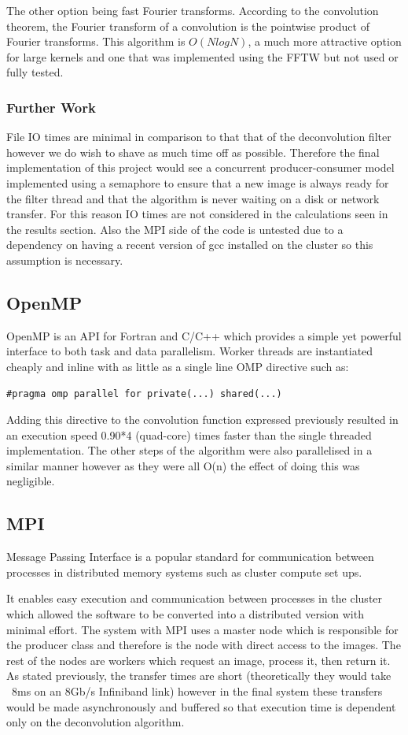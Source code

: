 \documentclass{article}
\begin{document}
The other option being fast Fourier transforms. According to the convolution
theorem, the Fourier transform of a convolution is the pointwise product of
Fourier transforms. This algorithm is $O(NlogN)$, a much more attractive option
for large kernels and one that was implemented using the FFTW but not used or
fully tested.

\subsubsection{Further Work}
File IO times are minimal in comparison to that that of the deconvolution filter
however we do wish to shave as much time off as possible. Therefore the final
implementation of this project would see a concurrent producer-consumer model
implemented using a semaphore to ensure that a new image is always ready for the
filter thread and that the algorithm is never waiting on a disk or network
transfer. For this reason IO times are not considered in the calculations seen
in the results section. Also the MPI side of the code is untested due to
a dependency on having a recent version of gcc installed on the cluster so this
assumption is necessary.

\subsection{OpenMP}
OpenMP is an API for Fortran and C/C++ which provides a simple yet powerful
interface to both task and data parallelism. Worker threads are instantiated
cheaply and inline with as little as a single line OMP directive such as:
\begin{verbatim}
#pragma omp parallel for private(...) shared(...)
\end{verbatim}

Adding this directive to the convolution function expressed previously resulted
in an execution speed 0.90*4 (quad-core) times faster than the single
threaded implementation. The other steps of the algorithm were also parallelised
in a similar manner however as they were all O(n) the effect of doing this was
negligible.

\subsection{MPI}
Message Passing Interface is a popular standard for communication between
processes in distributed memory systems such as cluster compute set ups.

It enables easy execution and communication between processes in the cluster
which allowed the software to be converted into a distributed version with
minimal effort. The system with MPI uses a master node which is responsible for
the producer class and therefore is the node with direct access to the images.
The rest of the nodes are workers which request an image, process it, then
return it. As stated previously, the transfer times are short (theoretically
they would take ~8ms on an 8Gb/s Infiniband link) however in the final system
these transfers would be made asynchronously and buffered so that execution time
is dependent only on the deconvolution algorithm.
\end{document}
